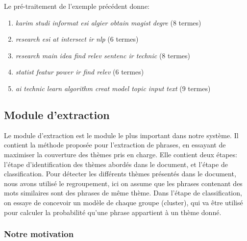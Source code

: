 \documentclass[a4paper,12pt,oneside]{../use/ESIthesis}
\begin{document}
\begin{kexp}
Le pré-traitement de l'exemple précédent donne:
\begin{enumerate}
\item \textit{karim studi informat esi algier obtain magist degre} (8 termes)
\item \textit{research esi at intersect ir nlp} (6 termes)
\item \textit{research main idea find relev sentenc ir technic} (8 termes)
\item \textit{statist featur power ir find relev} (6 termes)
\item \textit{ai technic learn algorithm creat model topic input text} (9 termes)
\end{enumerate}
\end{kexp}
%

\subsection{Module d'extraction}

Le module d'extraction est le module le plus important dans notre système. 
Il contient la méthode proposée pour l'extraction de phrases, en essayant de maximiser la couverture des thèmes pris en charge. 
Elle contient deux étapes: l'étape d'identification des thèmes abordés dans le document, et l'étape de classification. 
Pour détecter les différents thèmes présentés dans le document, nous avons utilisé le regroupement, ici on assume que les phrases contenant des mots similaires sont des phrases de même thème. 
Dans l'étape de classification, on essaye de concevoir un modèle de chaque groupe (cluster), qui va être utilisé pour calculer la probabilité qu'une phrase appartient à un thème donné.

\subsubsection{Notre motivation}
\end{document}

